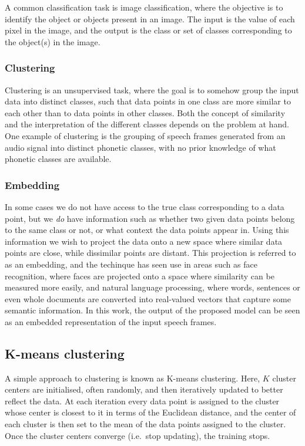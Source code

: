 A common classification task is image classification, where the objective is to identify the object or objects present in an image.
The input is the value of each pixel in the image, and the output is the class or set of classes corresponding to the object(s) in the image.

\subsubsection{Clustering}

Clustering is an unsupervised task, where the goal is to somehow group the input data into distinct classes, such that data points in one class are more similar to each other than to data points in other classes.
Both the concept of similarity and the interpretation of the different classes depends on the problem at hand.
One example of clustering is the grouping of speech frames generated from an audio signal into distinct phonetic classes, with no prior knowledge of what phonetic classes are available.

\subsubsection{Embedding}

In some cases we do not have access to the true class corresponding to a data point, but we \emph{do} have information such as whether two given data points belong to the same class or not, or what context the data points appear in.
Using this information we wish to project the data onto a new space where similar data points are close, while dissimilar points are distant.
This projection is referred to as an embedding, and the techinque has seen use in areas such as face recognition, where faces are projected onto a space where similarity can be measured more easily, and natural language processing, where words, sentences or even whole documents are converted into real-valued vectors that capture some semantic information.
In this work, the output of the proposed model can be seen as an embedded representation of the input speech frames.

\subsection{K-means clustering}

A simple approach to clustering is known as K-means clustering.
Here, $K$ cluster centers are initialised, often randomly, and then iteratively updated to better reflect the data.
At each iteration every data point is assigned to the cluster whose center is closest to it in terms of the Euclidean distance, and the center of each cluster is then set to the mean of the data points assigned to the cluster.
Once the cluster centers converge (i.e.\ stop updating), the training stops.


